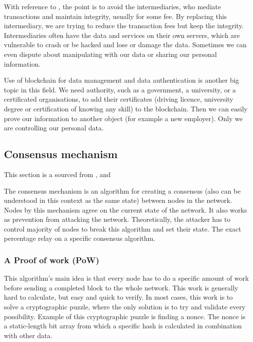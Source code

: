 \documentclass[thesis=M,english]{FITthesis}[2019/12/23]
\begin{document}
With reference to \cite{blockchainbusiness}, the point is to avoid the intermediaries, who mediate transactions and maintain integrity, usually for some fee. By replacing this intermediary, we are trying to reduce the transaction fees but keep the integrity. Intermediaries often have the data and services on their own servers, which are vulnerable to crash or be hacked and lose or damage the data. Sometimes we can even dispute about manipulating with our data or sharing our personal information.

Use of blockchain for data management and data authentication is another big topic in this field. We need authority, such as a government, a university, or a certificated organisations, to add their certificates (driving licence, university degree or certification of knowing any skill) to the blockchain. Then we can easily prove our information to another object (for example a new employer). Only we are controlling our personal data.

\subsection{Consensus mechanism}

This section is a sourced from \cite{mediumConsensus}, \cite{ethPow} and \cite{Singhal2018}

The consensus mechanism is an algorithm for creating a consensus (also can be understood in this context as the same state) between nodes in the network. Nodes by this mechanism agree on the current state of the network. It also works as prevention from attacking the network. Theoretically, the attacker has to control majority of nodes to break this algorithm and set their state. The exact percentage relay on a specific consensus algorithm. \cite{ethPow}

\subsubsection{A Proof of work (PoW)}
This algorithm's main idea is that every node has to do a specific amount of work before sending a completed block to the whole network. This work is generally hard to calculate, but easy and quick to verify. In most cases, this work is to solve a cryptographic puzzle, where the only solution is to try and validate every possibility. Example of this cryptographic puzzle is finding a nonce. The nonce is a static-length bit array from which a specific hash is calculated in combination with other data.
\end{document}
